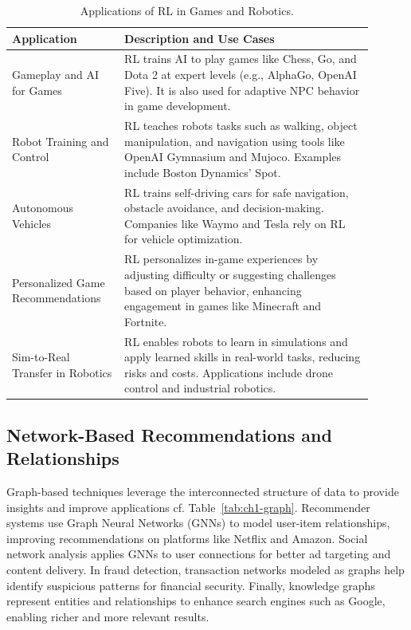\begin{table}[h]
\centering
\begin{tabular}{p{0.28\linewidth} p{0.62\linewidth}}
\toprule
\textbf{Application} & \textbf{Description and Use Cases} \\
\midrule
Gameplay and AI for Games &
RL trains AI to play games like Chess, Go, and Dota 2 at
expert levels (e.g., AlphaGo, OpenAI Five). It is also used
for adaptive NPC behavior in game development. \\
\midrule
Robot Training and Control &
RL teaches robots tasks such as walking, object manipulation,
and navigation using tools like OpenAI Gymnasium
and Mujoco. Examples include Boston Dynamics' Spot. \\
\midrule
Autonomous Vehicles &
RL trains self-driving cars for safe navigation, obstacle avoidance,
and decision-making. Companies like Waymo and
Tesla rely on RL for vehicle optimization. \\
\midrule
Personalized Game Recommendations &
RL personalizes in-game experiences by adjusting difficulty
or suggesting challenges based on player behavior, enhancing
engagement in games like Minecraft and Fortnite. \\
\midrule
Sim-to-Real Transfer in Robotics &
RL enables robots to learn in simulations and apply learned
skills in real-world tasks, reducing risks and costs. Applications
include drone control and industrial robotics. \\
\bottomrule
\end{tabular}
\caption{Applications of RL in Games and Robotics.}
\label{tab:ch1-rl}
\end{table}

\subsection{Network-Based Recommendations and Relationships}
\label{sec:ch1-graph}

Graph-based techniques leverage the interconnected structure of data to provide
insights and improve applications cf. Table~\ref{tab:ch1-graph}. Recommender systems
use Graph Neural Networks (GNNs) to model user-item relationships, improving
recommendations on platforms like Netflix and Amazon. Social network
analysis applies GNNs to user connections for better ad targeting and content
delivery. In fraud detection, transaction networks modeled as graphs help
identify suspicious patterns for financial security. Finally, knowledge graphs
represent entities and relationships to enhance search engines such as Google,
enabling richer and more relevant results.

